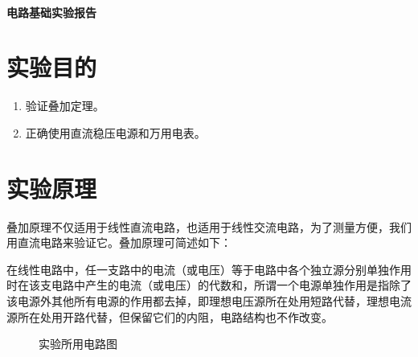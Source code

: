 \documentclass[a4paper,utf8]{article}
\begin{document}
\begin{center}
    {\mbox{}\\[7em]\bfseries\songti%
    电路基础实验报告}\\[34mm]
\end{center}
\newpage
\section{实验目的}
\begin{enumerate}
    \item 验证叠加定理。
    \item 正确使用直流稳压电源和万用电表。
\end{enumerate}

\section{实验原理}%
叠加原理不仅适用于线性直流电路，也适用于线性交流电路，为了测量方便，我们用直流电路来验证它。叠加原理可简述如下：\par
在线性电路中，任一支路中的电流（或电压）等于电路中各个独立源分别单独作用时在该支电路中产生的电流（或电压）的代数和，所谓一个电源单独作用是指除了该电源外其他所有电源的作用都去掉，即理想电压源所在处用短路代替，理想电流源所在处用开路代替，但保留它们的内阻，电路结构也不作改变。
\begin{figure}[!ht]
    \caption{实验所用电路图}
\end{figure}
\end{document}
